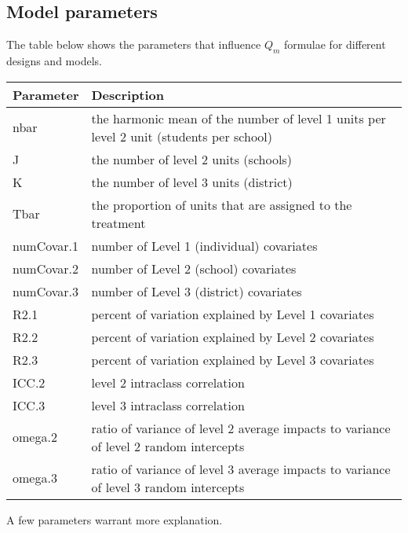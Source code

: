 \documentclass[
]{article}
\begin{document}
\subsection{Model parameters}
\label{sec:params}

The table below shows the parameters that influence \(Q_m\) formulae for
different designs and models.

\begin{tabular}{l|l}
\hline
Parameter & Description\\
\hline
nbar & the harmonic mean of the number of level 1 units per level 2 unit (students per school)\\
\hline
J & the number of level 2 units (schools)\\
\hline
K & the number of level 3 units (district)\\
\hline
Tbar & the proportion of units that are assigned to the treatment\\
\hline
numCovar.1 & number of Level 1 (individual) covariates\\
\hline
numCovar.2 & number of Level 2 (school) covariates\\
\hline
numCovar.3 & number of Level 3 (district) covariates\\
\hline
R2.1 & percent of variation explained by Level 1 covariates\\
\hline
R2.2 & percent of variation explained by Level 2 covariates\\
\hline
R2.3 & percent of variation explained by Level 3 covariates\\
\hline
ICC.2 & level 2 intraclass correlation\\
\hline
ICC.3 & level 3 intraclass correlation\\
\hline
omega.2 & ratio of variance of level 2 average impacts to variance of level 2 random intercepts\\
\hline
omega.3 & ratio of variance of level 3 average impacts to variance of level 3 random intercepts\\
\hline
\end{tabular}

A few parameters warrant more explanation.
\end{document}
